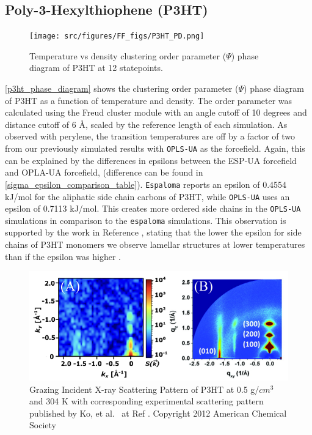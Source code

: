 \subsection{Poly-3-Hexylthiophene (P3HT)}
\begin{figure}[hbt!]
    \centering
    \texttt{[image: src/figures/FF\_figs/P3HT\_PD.png]} %
    \caption{Temperature vs density clustering order parameter ($\Psi$) phase diagram of P3HT at 12 statepoints.}
    \label{p3ht_phase_diagram}
\end{figure}
\par \autoref{p3ht_phase_diagram} shows the clustering order parameter ($\Psi$) phase diagram of P3HT as a function of temperature and density. The order parameter was calculated using the Freud cluster module  with an angle cutoff of 10 degrees and distance cutoff of 6 \AA, scaled by the reference length of each simulation. As observed with perylene, the transition temperatures are off by a factor of two from our previously simulated results with \texttt{OPLS-UA} as the forcefield. Again, this can be explained by the differences in epsilons between the ESP-UA forcefield and OPLA-UA forcefield, (difference can be found in \autoref{sigma_epsilon_comparison_table}). \texttt{Espaloma} reports an epsilon of 0.4554 kJ/mol for the aliphatic side chain carbons of P3HT, while \texttt{OPLS-UA} uses an epsilon of 0.7113 kJ/mol. This creates more ordered side chains in the \texttt{OPLS-UA} simulations in comparison to the \texttt{espaloma} simulations. This observation is supported by the work in Reference \citep{marsh_controlling_2014}, stating that the lower the epsilon for side chains of P3HT monomers we observe lamellar structures at lower temperatures than if the epsilon was higher \citep{marsh_controlling_2014}. 
\begin{figure}[h!]
    \centering
    \includegraphics[width=.9\textwidth]{src/figures/FF_figs/p3htGIXS&exp.png} %
    \caption{Grazing Incident X-ray Scattering Pattern of P3HT at 0.5 g/$cm^3$ and 304 K with corresponding experimental scattering pattern published by Ko, et al.~ at Ref \citep{p3ht_experimental}. Copyright 2012 American Chemical Society}
    \label{p3ht_GIXS}
\end{figure}
